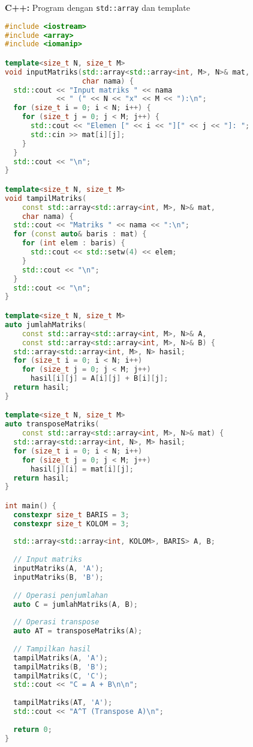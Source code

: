 \documentclass[../main.tex]{subfiles}
\begin{document}
\textbf{C++:} Program dengan \texttt{std::array} dan template
\begin{lstlisting}[language=C++, caption={Program operasi matriks di C++}]
#include <iostream>
#include <array>
#include <iomanip>

template<size_t N, size_t M>
void inputMatriks(std::array<std::array<int, M>, N>& mat,
                  char nama) {
  std::cout << "Input matriks " << nama 
            << " (" << N << "x" << M << "):\n";
  for (size_t i = 0; i < N; i++) {
    for (size_t j = 0; j < M; j++) {
      std::cout << "Elemen [" << i << "][" << j << "]: ";
      std::cin >> mat[i][j];
    }
  }
  std::cout << "\n";
}

template<size_t N, size_t M>
void tampilMatriks(
    const std::array<std::array<int, M>, N>& mat,
    char nama) {
  std::cout << "Matriks " << nama << ":\n";
  for (const auto& baris : mat) {
    for (int elem : baris) {
      std::cout << std::setw(4) << elem;
    }
    std::cout << "\n";
  }
  std::cout << "\n";
}

template<size_t N, size_t M>
auto jumlahMatriks(
    const std::array<std::array<int, M>, N>& A,
    const std::array<std::array<int, M>, N>& B) {
  std::array<std::array<int, M>, N> hasil;
  for (size_t i = 0; i < N; i++)
    for (size_t j = 0; j < M; j++)
      hasil[i][j] = A[i][j] + B[i][j];
  return hasil;
}

template<size_t N, size_t M>
auto transposeMatriks(
    const std::array<std::array<int, M>, N>& mat) {
  std::array<std::array<int, N>, M> hasil;
  for (size_t i = 0; i < N; i++)
    for (size_t j = 0; j < M; j++)
      hasil[j][i] = mat[i][j];
  return hasil;
}

int main() {
  constexpr size_t BARIS = 3;
  constexpr size_t KOLOM = 3;
  
  std::array<std::array<int, KOLOM>, BARIS> A, B;
  
  // Input matriks
  inputMatriks(A, 'A');
  inputMatriks(B, 'B');
  
  // Operasi penjumlahan
  auto C = jumlahMatriks(A, B);
  
  // Operasi transpose
  auto AT = transposeMatriks(A);
  
  // Tampilkan hasil
  tampilMatriks(A, 'A');
  tampilMatriks(B, 'B');
  tampilMatriks(C, 'C');
  std::cout << "C = A + B\n\n";
  
  tampilMatriks(AT, 'A');
  std::cout << "A^T (Transpose A)\n";
  
  return 0;
}
\end{lstlisting}
\end{document}
